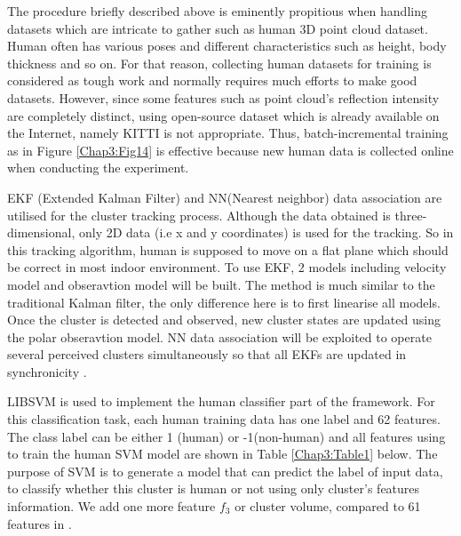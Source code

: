 The procedure briefly described above is eminently propitious when handling datasets which
are intricate to gather such as human 3D point cloud dataset. Human often has various poses
and different characteristics such as height, body thickness and so on. For that reason, collecting
human datasets for training is considered as tough work and normally requires much efforts to make
good datasets. However, since some features such as point cloud's reflection intensity are completely
distinct, using open-source dataset which is already available on the Internet, namely KITTI is
not appropriate. Thus, batch-incremental training \cite{online_learning,online_learning_2020} as in
Figure \ref{Chap3:Fig14} is effective because new human data is collected online when conducting the
experiment.

EKF (Extended Kalman Filter) and NN(Nearest neighbor) data association \cite{online_learning,online_learning_2020,probab_robot}
are utilised for the cluster tracking process. Although the data obtained is three-dimensional,
only 2D data (i.e x and y coordinates) is used for the tracking. So in this tracking algorithm,
human is supposed to move on a flat plane which should be correct in most indoor environment.
To use EKF, 2 models including velocity model and obseravtion model will be built. The method is much similar
to the traditional Kalman filter, the only difference here is to first linearise all models.
Once the cluster is detected and observed, new cluster states are updated using the polar obseravtion model.
NN data association will be exploited to operate several perceived clusters simultaneously so that all EKFs are
updated in synchronicity \cite{online_learning,online_learning_2020}.

LIBSVM \cite{libsvm} is used to implement the human classifier part of the framework. For this classification task, each human training data has one label and 62 features. The class label can be either 1 (human)
or -1(non-human) and all features using to train the human SVM model are shown in Table \ref{Chap3:Table1} below. The purpose
of SVM is to generate a model that can predict the label of input data, to classify whether this cluster is human or not using
only cluster's features information. We add one more feature $f_3$ or cluster volume, compared to 61 features in \cite{online_learning}.

